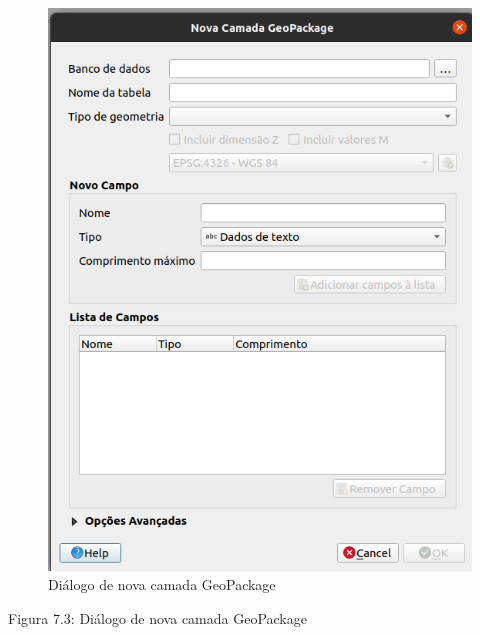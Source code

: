 \documentclass[
]{book}
\begin{document}
\begin{figure}
\centering
\includegraphics{media/modulo7/new-geopackage-dialog.png}
\caption{Diálogo de nova camada GeoPackage}
\end{figure}

Figura 7.3: Diálogo de nova camada GeoPackage
\end{document}
